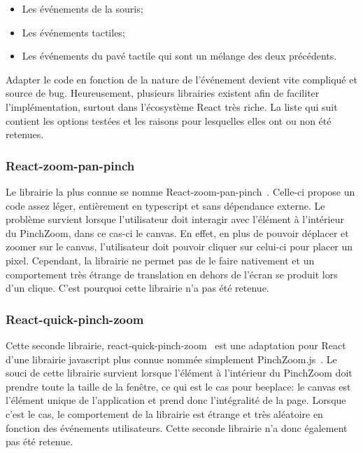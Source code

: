 \begin{itemize}
  \item Les événements de la souris;
  \item Les événements tactiles;
  \item Les événements du pavé tactile qui sont un mélange des deux précédents.
\end{itemize}

Adapter le code en fonction de la nature de l'événement devient vite compliqué et source de bug. Heureusement, plusieurs librairies existent afin de faciliter l'implémentation, surtout dans l'écosystème React très riche. La liste qui suit contient les options testées et les raisons pour lesquelles elles ont ou non été retenues.

\subsubsection{React-zoom-pan-pinch}

Le librairie la plus connue se nomme React-zoom-pan-pinch~\cite{react-zoom-pan-pinch}. Celle-ci propose un code assez léger, entièrement en \gls{typescript} et sans dépendance externe. Le problème survient lorsque l'utilisateur doit interagir avec l'élément à l'intérieur du PinchZoom, dans ce cas-ci le canvas. En effet, en plus de pouvoir déplacer et zoomer sur le canvas, l'utilisateur doit pouvoir cliquer sur celui-ci pour placer un pixel. Cependant, la librairie ne permet pas de le faire nativement et un comportement très étrange de translation en dehors de l'écran se produit lors d'un clique. C'est pourquoi cette librairie n'a pas été retenue.

\subsubsection{React-quick-pinch-zoom}

Cette seconde librairie, react-quick-pinch-zoom~\cite{react-quick-pinch-zoom} est une adaptation pour React d'une librairie \gls{javascript} plus connue nommée simplement PinchZoom.js~\cite{pinchzoomjs}. Le souci de cette librairie survient lorsque l'élément à l'intérieur du PinchZoom doit prendre toute la taille de la fenêtre, ce qui est le cas pour \gls{beeplace}: le canvas est l'élément unique de l'application et prend donc l'intégralité de la page. Lorsque c'est le cas, le comportement de la librairie est étrange et très aléatoire en fonction des événements utilisateurs. Cette seconde librairie n'a donc également pas été retenue.

